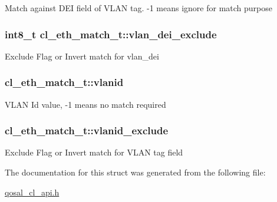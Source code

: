 Match against D\-E\-I field of V\-L\-A\-N tag. -\/1 means ignore for match purpose \hypertarget{structcl__eth__match__t_ad4acd32623bc522bf2810a3f0198de04}{
\subsubsection[{vlan\-\_\-dei\-\_\-exclude}]{\setlength{\rightskip}{0pt plus 5cm}int8\-\_\-t cl\-\_\-eth\-\_\-match\-\_\-t\-::vlan\-\_\-dei\-\_\-exclude}}\label{structcl__eth__match__t_ad4acd32623bc522bf2810a3f0198de04}
Exclude Flag or Invert match for vlan\-\_\-dei \hypertarget{structcl__eth__match__t_ae82737ae0d02ba92f5196a9d1a2b4e60}{
\subsubsection[{vlanid}]{ cl\-\_\-eth\-\_\-match\-\_\-t\-::vlanid}}\label{structcl__eth__match__t_ae82737ae0d02ba92f5196a9d1a2b4e60}
V\-L\-A\-N Id value, -\/1 means no match required \hypertarget{structcl__eth__match__t_a72b9fe10cf00c934df759909399a399e}{
\subsubsection[{vlanid\-\_\-exclude}]{ cl\-\_\-eth\-\_\-match\-\_\-t\-::vlanid\-\_\-exclude}}\label{structcl__eth__match__t_a72b9fe10cf00c934df759909399a399e}
Exclude Flag or Invert match for V\-L\-A\-N tag field 

The documentation for this struct was generated from the following file\-:\begin{DoxyCompactItemize}
\item 
\hyperlink{qosal__cl__api_8h}{qosal\-\_\-cl\-\_\-api.\-h}\end{DoxyCompactItemize}
